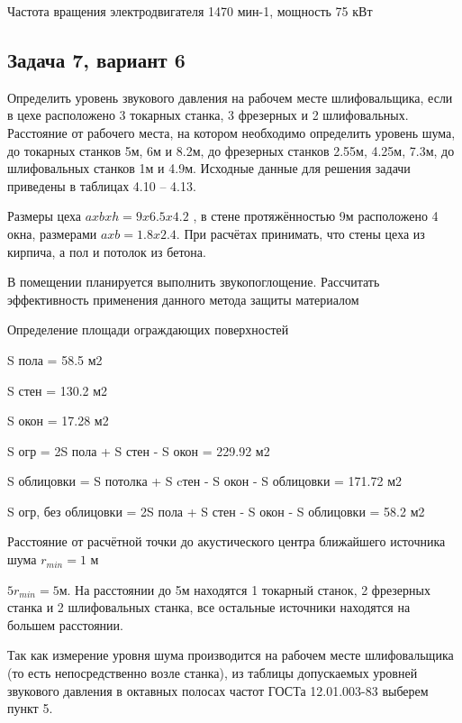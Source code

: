 \documentclass[12pt]{article}
\begin{document}
Частота вращения электродвигателя 1470 мин-1, мощность 75 кВт

\subsection*{Задача 7, вариант 6}

Определить уровень звукового давления на рабочем месте шлифовальщика, если в цехе расположено 3 токарных станка, 3 фрезерных и 2 шлифовальных. Расстояние от рабочего места, на котором необходимо определить уровень шума, до токарных станков 5м, 6м и 8.2м, до фрезерных станков 2.55м, 4.25м, 7.3м, до шлифовальных станков 1м и 4.9м. Исходные данные для решения задачи приведены в таблицах 4.10 – 4.13.

Размеры цеха $a x b x h = 9 x 6.5 x 4.2$ , в стене протяжённостью 9м расположено 4 окна, размерами $a x b = 1.8 x 2.4$. При расчётах принимать, что стены цеха из кирпича, а пол и потолок из бетона.

В помещении планируется выполнить звукопоглощение. Рассчитать эффективность применения данного метода защиты материалом

Определение площади ограждающих поверхностей

S пола = 58.5 м2

S стен = 130.2 м2

S окон = 17.28 м2

S огр = 2S пола + S стен - S окон = 229.92 м2

S облицовки = S потолка + S cтен - S окон - S облицовки = 171.72 м2

S огр, без облицовки = 2S пола + S стен - S окон - S облицовки = 58.2 м2

Расстояние от расчётной точки до акустического центра ближайшего источника шума $r_{min} = 1$ м

$5r_{min} = 5$м. На расстоянии до 5м находятся 1 токарный станок, 2 фрезерных станка и 2 шлифовальных станка, все остальные источники находятся на большем расстоянии.


Так как измерение уровня шума производится на рабочем месте шлифовальщика (то есть непосредственно возле станка), из таблицы допускаемых уровней звукового давления в октавных полосах частот ГОСТа 12.01.003-83 выберем пункт 5.
\end{document}
